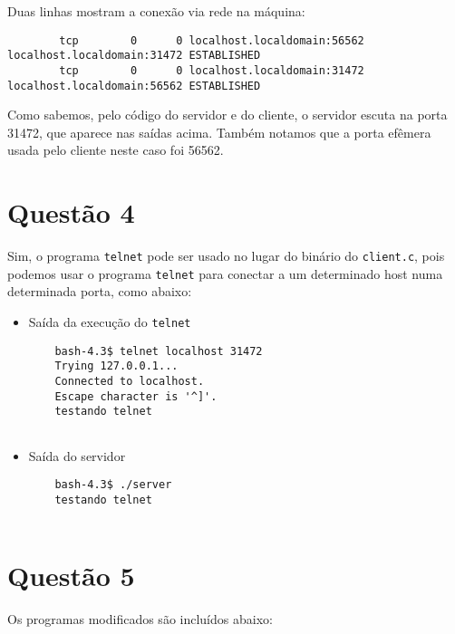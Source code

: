 \documentclass[a4paper,10pt]{article}
\begin{document}
    Duas linhas mostram a conexão via rede na máquina:
    
    \begin{lstlisting}
        tcp        0      0 localhost.localdomain:56562 localhost.localdomain:31472 ESTABLISHED
        tcp        0      0 localhost.localdomain:31472 localhost.localdomain:56562 ESTABLISHED
    \end{lstlisting}
    
    Como sabemos, pelo código do servidor e do cliente, o servidor escuta na porta 31472, que aparece nas saídas acima. Também notamos que a porta efêmera usada pelo cliente neste caso foi 56562.

\section{Questão 4}
    Sim, o programa {\tt telnet} pode ser usado no lugar do binário do {\tt client.c}, pois podemos usar o programa {\tt telnet} para conectar a um determinado host numa determinada porta, como abaixo:
    
    \begin{itemize}
        \item Saída da execução do {\tt telnet}
            \begin{lstlisting}
    bash-4.3$ telnet localhost 31472
    Trying 127.0.0.1...
    Connected to localhost.
    Escape character is '^]'.
    testando telnet
        
            \end{lstlisting}
    
        \item Saída do servidor
            \begin{lstlisting}
    bash-4.3$ ./server 
    testando telnet
    
            \end{lstlisting}
    \end{itemize}

\section{Questão 5}
    Os programas modificados são incluídos abaixo:
    
\end{document}
